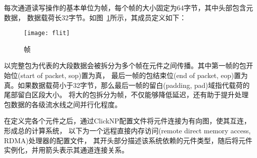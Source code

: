 每次通道读写操作的基本单位为帧，每个帧的大小固定为64字节，其中头部包含元数据，
数据载荷长32字节。如图~\ref{fig:flit}所示，其成员定义如下：


\begin{figure}
\centering
\texttt{[image: flit]}
\caption{帧} \label{fig:flit}
\end{figure}

以完整包为代表的大段数据会被拆分为多个帧在元件之间传播。其中第一帧的包开始位(start of packet, sop)置为真，
最后一帧的包结束位(end of packet, eop)置为真。如果数据载荷小于32字节，那么最后一帧的留白(padding, pad)域指代载荷的尾部留白区段大小。
将大的包拆分为帧，不仅能够降低延迟，还有助于提升处理包数据的各级流水线之间并行化程度。

在定义完各个元件之后，通过ClickNP配置文件将元件连接为有向图，使其互连，形成总的计算系统，
以下为一个远程直接内存访问(remote direct memory access, RDMA)处理器的配置文件，
其开头部分描述该系统依赖的元件类型，随后将元件实例化，并用箭头表示其通道连接关系。

